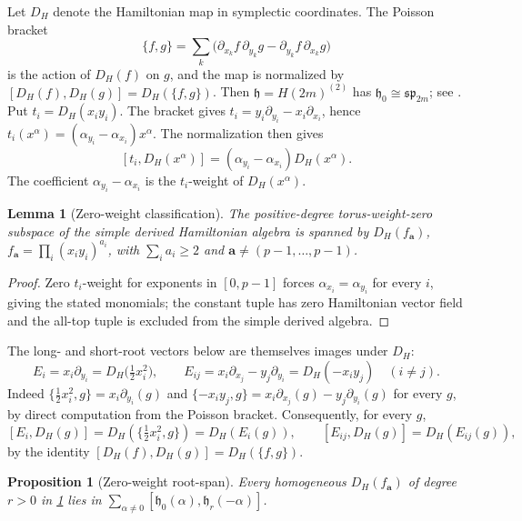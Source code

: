 \documentclass[11pt,reqno]{amsart}
\newtheorem{proposition}[proposition]{Proposition}
\newtheorem{lemma}[lemma]{Lemma}
\theoremstyle{definition}
\theoremstyle{remark}
\theoremstyle{definition}
\begin{document}
Let $D_H$ denote the Hamiltonian map in symplectic coordinates. The
Poisson bracket
\[
 \{f,g\}=\sum_k\bigl(\partial_{x_k}f\,\partial_{y_k}g
 -\partial_{y_k}f\,\partial_{x_k}g\bigr)
\]
is the action of $D_H(f)$ on $g$, and the map is normalized by
$[D_H(f),D_H(g)]=D_H(\{f,g\})$.
Then $\mathfrak h=H(2m)^{(2)}$ has $\mathfrak h_0\cong\mathfrak{sp}_{2m}$;
see \cite[Section~2]{Mygind2014}.
Put $t_i=D_H(x_iy_i)$. The bracket gives
$t_i=y_i\partial_{y_i}-x_i\partial_{x_i}$, hence
$t_i(x^\alpha)=(\alpha_{y_i}-\alpha_{x_i})x^\alpha$.
The normalization then gives
\begin{equation}\label{eq:ham-weight}
 [t_i,D_H(x^\alpha)]=(\alpha_{y_i}-\alpha_{x_i})D_H(x^\alpha).
\end{equation}
The coefficient $\alpha_{y_i}-\alpha_{x_i}$ is the $t_i$-weight of
$D_H(x^\alpha)$.

\begin{lemma}[Zero-weight classification]\label{lem:hamiltonian-zero-weight}
The positive-degree torus-weight-zero subspace of the simple derived
Hamiltonian algebra is spanned by
$D_H(f_{\mathbf a})$, $f_{\mathbf a}=\prod_i(x_iy_i)^{a_i}$, with
$\sum_i a_i\ge2$ and $\mathbf a\ne(p-1,\ldots,p-1)$.
\end{lemma}

\begin{proof}
Zero $t_i$-weight for exponents in $[0,p-1]$ forces $\alpha_{x_i}=\alpha_{y_i}$
for every $i$, giving the stated monomials; the constant tuple has zero
Hamiltonian vector field and the all-top tuple is excluded from the simple
derived algebra.
\end{proof}

The long- and short-root vectors below are themselves images under $D_H$:
\[
 E_i=x_i\partial_{y_i}=D_H\bigl(\tfrac12x_i^2\bigr),
 \qquad
 E_{ij}=x_i\partial_{x_j}-y_j\partial_{y_i}=D_H(-x_iy_j)\quad(i\ne j).
\]
Indeed $\{\tfrac12x_i^2,g\}=x_i\partial_{y_i}(g)$ and
$\{-x_iy_j,g\}=x_i\partial_{x_j}(g)-y_j\partial_{y_i}(g)$ for every $g$, by
direct computation from the Poisson bracket.
Consequently, for every $g$,
\begin{equation}\label{eq:ham-equiv}
 [E_i,D_H(g)]=D_H(\{\tfrac12x_i^2,g\})=D_H(E_i(g)),
 \qquad
 [E_{ij},D_H(g)]=D_H(E_{ij}(g)),
\end{equation}
by the identity $[D_H(f),D_H(g)]=D_H(\{f,g\})$.

\begin{proposition}[Zero-weight root-span]\label{prop:hamiltonian-root-span}
Every homogeneous $D_H(f_{\mathbf a})$ of degree $r>0$ in
\cref{lem:hamiltonian-zero-weight} lies in
$\sum_{\alpha\ne0}[\mathfrak h_0(\alpha),\mathfrak h_r(-\alpha)]$.
\end{proposition}
\end{document}
